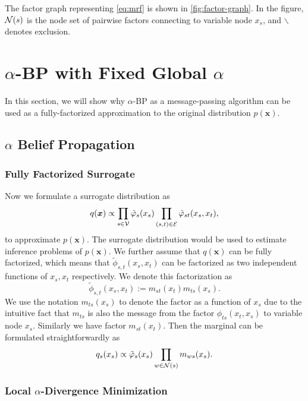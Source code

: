 \documentclass[conference,onecolumn]{IEEEtran}
\begin{document}
The factor graph representing \autoref{eq:mrf} is shown in
\autoref{fig:factor-graph}. In the figure, $\mathcal{N}(s)$ is the node set of
pairwise factors connecting to variable node $x_s$, and $\backslash$ denotes exclusion.

\section{$\alpha$-BP with Fixed Global $\alpha$}\label{sec:alpha-bp-factor-refine}
In this section, we will show why $\alpha$-BP as a message-passing algorithm can be used as a fully-factorized approximation to the original distribution $p(\bm{x})$. 




\subsection{$\alpha$ Belief Propagation}\label{sec:alpha-bp-a}
\subsubsection{Fully Factorized Surrogate}
Now we formulate a surrogate distribution as
\begin{equation}
  q(\bm{x}) \propto \prod_{{s\in \mathcal{V}}} \tilde{\varphi}_s(x_s) \prod_{(s,t) \in \mathcal{E}} \tilde{\varphi}_{st}(x_s, x_t),
\end{equation}
to approximate $p(\bm{x})$. The surrogate distribution would be used to estimate inference problems of $p(\bm{x})$. We further assume that $q(\bm{x})$ can be fully factorized, which means that $\tilde{\phi}_{s,t}(x_s, x_t)$ can be factorized as two independent functions of $x_s, x_t$ respectively. We denote this factorization as
\begin{equation}
  \tilde{\phi}_{s,t}(x_s, x_t) := m_{st}(x_t) m_{ts}(x_s).
\end{equation}
We use the notation $m_{ts}(x_s)$ to denote the factor as a function of $x_s$ due to the intuitive fact that $m_{ts}$ is also the message from the factor $\phi_{ts}(x_t, x_s)$ to variable node $x_s$. Similarly we have factor $m_{st}(x_t)$. Then the marginal can be formulated straightforwardly as
\begin{equation}
  q_s(x_s) \propto \tilde{\varphi}_s(x_s) \prod_{w\in \mathcal{N}(s)} m_{ws}(x_s).
\end{equation}

\subsubsection{Local $\alpha$-Divergence Minimization}
\end{document}
